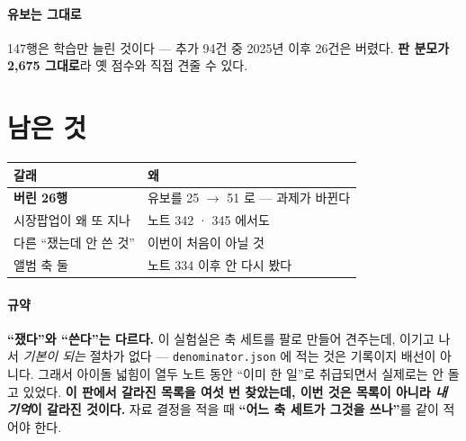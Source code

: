 \documentclass[10pt]{article}
\begin{document}
\paragraph{유보는 그대로} 147행은 학습만 늘린 것이다 --- 추가 94건 중
2025년 이후 26건은 버렸다. \textbf{판 분모가 2,675 그대로}라 옛 점수와
직접 견줄 수 있다.

\section{남은 것}
\begin{center}\footnotesize
\begin{tabular}{ll}
\hline
갈래 & 왜 \\
\hline
\textbf{버린 26행} & 유보를 25 $\to$ 51 로 --- 과제가 바뀐다 \\
시장팝업이 왜 또 지나 & 노트 342 · 345 에서도 \\
다른 ``쟀는데 안 쓴 것'' & 이번이 처음이 아닐 것 \\
앨범 축 둘 & 노트 334 이후 안 다시 봤다 \\
\hline
\end{tabular}
\end{center}

\paragraph{규약} \textbf{``쟀다''와 ``쓴다''는 다르다.} 이 실험실은 축 세트를
팔로 만들어 견주는데, 이기고 나서 \emph{기본이 되는} 절차가 없다 ---
\texttt{denominator.json} 에 적는 것은 기록이지 배선이 아니다. 그래서
아이돌 넓힘이 열두 노트 동안 ``이미 한 일''로 취급되면서 실제로는 안
돌고 있었다. \textbf{이 판에서 갈라진 목록을 여섯 번 찾았는데, 이번 것은
목록이 아니라 \emph{내 기억}이 갈라진 것이다.} 자료 결정을 적을 때
\textbf{``어느 축 세트가 그것을 쓰나''}를 같이 적어야 한다.
\end{document}
